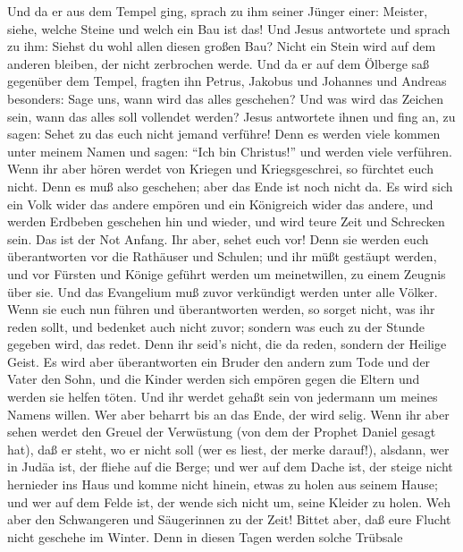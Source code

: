  Und da er aus dem Tempel ging, sprach zu ihm seiner Jünger
einer: Meister, siehe, welche Steine und welch ein Bau ist das!
 Und Jesus antwortete und sprach zu ihm: Siehst du wohl
allen diesen großen Bau? Nicht ein Stein wird auf dem anderen bleiben,
der nicht zerbrochen werde.  Und da er auf dem Ölberge saß
gegenüber dem Tempel, fragten ihn Petrus, Jakobus und Johannes und
Andreas besonders:  Sage uns, wann wird das alles geschehen?
Und was wird das Zeichen sein, wann das alles soll vollendet werden?
 Jesus antwortete ihnen und fing an, zu sagen: Sehet zu das
euch nicht jemand verführe!  Denn es werden viele kommen
unter meinem Namen und sagen: ``Ich bin Christus!'' und werden viele
verführen.  Wenn ihr aber hören werdet von Kriegen und
Kriegsgeschrei, so fürchtet euch nicht. Denn es muß also geschehen; aber
das Ende ist noch nicht da.  Es wird sich ein Volk wider das
andere empören und ein Königreich wider das andere, und werden Erdbeben
geschehen hin und wieder, und wird teure Zeit und Schrecken sein. Das
ist der Not Anfang.  Ihr aber, sehet euch vor! Denn sie
werden euch überantworten vor die Rathäuser und Schulen; und ihr müßt
gestäupt werden, und vor Fürsten und Könige geführt werden um
meinetwillen, zu einem Zeugnis über sie.  Und das
Evangelium muß zuvor verkündigt werden unter alle Völker. 
Wenn sie euch nun führen und überantworten werden, so sorget nicht, was
ihr reden sollt, und bedenket auch nicht zuvor; sondern was euch zu der
Stunde gegeben wird, das redet. Denn ihr seid's nicht, die da reden,
sondern der Heilige Geist.  Es wird aber überantworten ein
Bruder den andern zum Tode und der Vater den Sohn, und die Kinder werden
sich empören gegen die Eltern und werden sie helfen töten. 
Und ihr werdet gehaßt sein von jedermann um meines Namens willen. Wer
aber beharrt bis an das Ende, der wird selig.  Wenn ihr
aber sehen werdet den Greuel der Verwüstung (von dem der Prophet Daniel
gesagt hat), daß er steht, wo er nicht soll (wer es liest, der merke
darauf!), alsdann, wer in Judäa ist, der fliehe auf die Berge;
 und wer auf dem Dache ist, der steige nicht hernieder ins
Haus und komme nicht hinein, etwas zu holen aus seinem Hause;
 und wer auf dem Felde ist, der wende sich nicht um, seine
Kleider zu holen.  Weh aber den Schwangeren und Säugerinnen
zu der Zeit!  Bittet aber, daß eure Flucht nicht geschehe
im Winter.  Denn in diesen Tagen werden solche Trübsale
